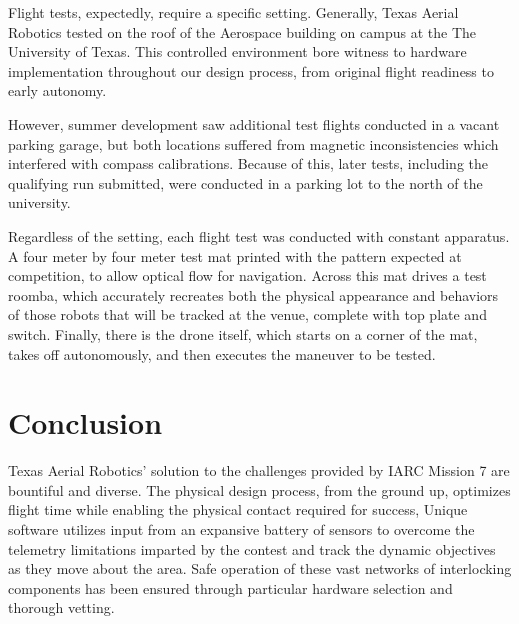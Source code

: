 \documentclass[12pt,letterpaper]{article}
\begin{document}
		Flight tests, expectedly, require a specific setting. Generally, Texas Aerial Robotics tested on the roof of the Aerospace building on campus at the The University of Texas. This controlled environment bore witness to hardware implementation throughout our design process, from original flight readiness to early autonomy.

		However, summer development saw additional test flights conducted in a vacant parking garage, but both locations suffered from magnetic inconsistencies which interfered with compass calibrations. Because of this, later tests, including the qualifying run submitted, were conducted in a parking lot to the north of the university.

		Regardless of the setting, each flight test was conducted with constant apparatus. A four meter by four meter test mat printed with the pattern expected at competition, to allow optical flow for navigation. Across this mat drives a test roomba, which accurately recreates both the physical appearance and behaviors of those robots that will be tracked at the venue, complete with top plate and switch. Finally, there is the drone itself, which starts on a corner of the mat, takes off autonomously, and then executes the maneuver to be tested.


\section*{Conclusion}
		Texas Aerial Robotics' solution to the challenges provided by IARC Mission 7 are bountiful and diverse. The physical design process, from the ground up, optimizes flight time while enabling the physical contact required for success, Unique software utilizes input from an expansive battery of sensors to overcome the telemetry limitations imparted by the contest and track the dynamic objectives as they move about the area. Safe operation of these vast networks of interlocking components has been ensured through particular hardware selection and thorough vetting.
	\nocite{redmon2016yolo9000}
	\nocite{GitHubSPACEROBOTICS}
	\nocite{HoughTransform}
	\nocite{CannyEdgeDetection}
	
	
\end{document}
